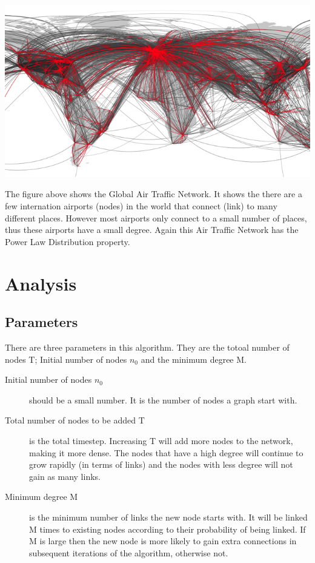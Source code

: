 \documentclass[a0,final]{a0poster}
\begin{document}
\begin{multicols}{3}
\centerline{\includegraphics[width=35cm]{airtraffic.jpg}}

The figure above shows the Global Air Traffic Network. It shows the there are a few internation airports (nodes) in the world that connect (link) to many different places. However most airports only connect to a small number of places, thus these airports have a small degree. Again this Air Traffic Network has the Power Law Distribution property.


\columnbreak



\section*{Analysis}
\subsection{Parameters}
There are three parameters in this algorithm. They are the totoal number of nodes T;  Initial number of nodes $n_0$ and the minimum degree M. \\
\begin{description} 
  \item[Initial number of nodes $n_0$] should be a small number. It is the number of nodes a graph start with.
  \item[Total number of nodes to be added T] is the total timestep. Increasing T will add more nodes to the network, making it more dense. The nodes that have a high degree will continue to grow rapidly (in terms of links) and the nodes with less degree will not gain as many links.
  \item[Minimum degree M] is the minimum number of links the new node starts with. It will be linked M times to existing nodes according to their probability of being linked. If M is large then the new node is more likely to gain extra connections in subsequent iterations of the algorithm, otherwise not.
\end{description}


\end{multicols}
\end{document}
